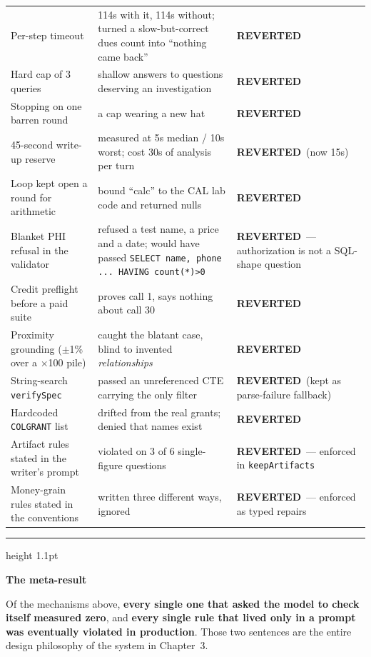 \documentclass[11pt,a4paper]{report}
\newcommand{\code}[1]{\texttt{\small #1}}
\newenvironment{keybox}[1]
 {\par\medskip\begin{center}\begin{minipage}{0.94\textwidth}%
  {\color{navy}\hrule height 1.1pt}\vspace{5pt}\par
  \textbf{\color{navy}#1}\par\vspace{3pt}\small}
 {\par\vspace{5pt}{\color{mist}\hrule height 0.8pt}\end{minipage}\end{center}\medskip}
\newcommand{\verdictR}{{\color{amber}\textbf{REVERTED}}}
\begin{document}
\begin{center}
\begin{longtable}{@{}p{4.6cm}p{7.2cm}p{2.6cm}@{}}
Per-step timeout & 114s with it, 114s without; turned a slow-but-correct dues count into ``nothing came back'' & \verdictR\\
Hard cap of 3 queries & shallow answers to questions deserving an investigation & \verdictR\\
Stopping on one barren round & a cap wearing a new hat & \verdictR\\
45-second write-up reserve & measured at 5s median / 10s worst; cost 30s of analysis per turn & \verdictR\ (now 15s)\\
Loop kept open a round for arithmetic & bound ``calc'' to the CAL lab code and returned nulls & \verdictR\\
Blanket PHI refusal in the validator & refused a test name, a price and a date; would have passed \code{SELECT name, phone ... HAVING count(*)>0} & \verdictR\ --- authorization is not a SQL-shape question\\
Credit preflight before a paid suite & proves call 1, says nothing about call 30 & \verdictR\\
Proximity grounding ($\pm$1\% over a $\times$100 pile) & caught the blatant case, blind to invented \emph{relationships} & \verdictR\\
String-search \code{verifySpec} & passed an unreferenced CTE carrying the only filter & \verdictR\ (kept as parse-failure fallback)\\
Hardcoded \code{COLGRANT} list & drifted from the real grants; denied that names exist & \verdictR\\
Artifact rules stated in the writer's prompt & violated on 3 of 6 single-figure questions & \verdictR\ --- enforced in \code{keepArtifacts}\\
Money-grain rules stated in the conventions & written three different ways, ignored & \verdictR\ --- enforced as typed repairs\\
\bottomrule
\end{longtable}
\end{center}

\begin{keybox}{The meta-result}
Of the mechanisms above, \textbf{every single one that asked the model to check itself measured
zero}, and \textbf{every single rule that lived only in a prompt was eventually violated in
production}. Those two sentences are the entire design philosophy of the system in Chapter~3.
\end{keybox}

\end{document}
